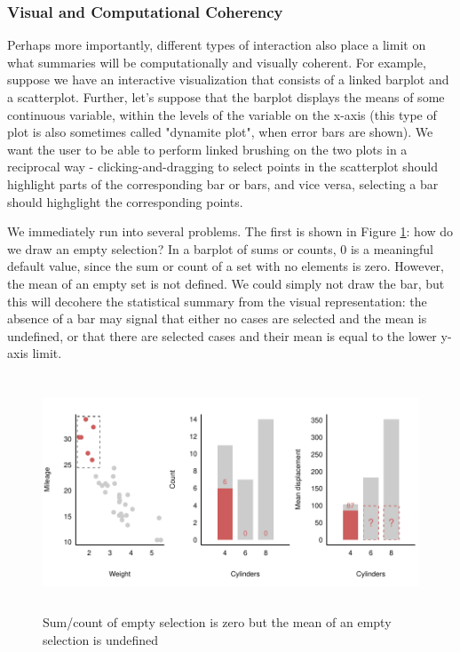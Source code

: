\documentclass[12pt,a4paper]{article}
\begin{document}
\subsubsection{Visual and Computational Coherency}

Perhaps more importantly, different types of interaction also place a limit on what summaries will be computationally and visually coherent. For example, suppose we have an interactive visualization that consists of a linked barplot and a scatterplot. Further, let's suppose that the barplot displays the means of some continuous variable, within the levels of the variable on the x-axis (this type of plot is also sometimes called "dynamite plot", when error bars are shown). We want the user to be able to perform linked brushing on the two plots in a reciprocal way - clicking-and-dragging to select points in the scatterplot should highlight parts of the corresponding bar or bars, and vice versa, selecting a bar should highglight the corresponding points.

We immediately run into several problems. The first is shown in Figure \ref{fig:empty}: how do we draw an empty selection? In a barplot of sums or counts, 0 is a meaningful default value, since the sum or count of a set with no elements is zero. However, the mean of an empty set is not defined. We could simply not draw the bar, but this will decohere the statistical summary from the visual representation: the absence of a bar may signal that either no cases are selected and the mean is undefined, or that there are selected cases and their mean is equal to the lower y-axis limit.

\begin{figure}[H]
\centering
\includegraphics[height=70mm]{./figure01.pdf}
\caption{Sum/count of empty selection is zero but the mean of an empty selection is undefined}
\label{fig:empty}
\end{figure}
\end{document}
